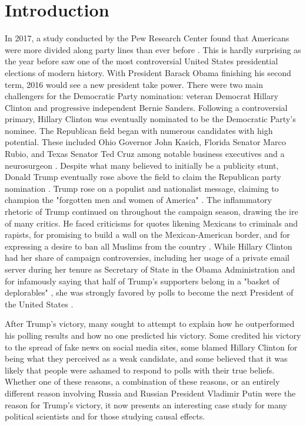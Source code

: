 \documentclass[11pt, conference,compsoc]{IEEEtran}
\begin{document}
\section{Introduction}
In 2017, a study conducted by the Pew Research Center found that Americans were more divided along party lines than ever before \cite{pewdivided}. This is hardly surprising as the year before saw one of the most controversial United States presidential elections of modern history. With President Barack Obama finishing his second term, 2016 would see a new president take power. There were two main challengers for the Democratic Party nomination: veteran Democrat Hillary Clinton and progressive independent Bernie Sanders. Following a controversial \cite{DNCcontroversy} primary, Hillary Clinton was eventually nominated to be the Democratic Party's nominee. The Republican field began with numerous candidates with high potential. These included Ohio Governor John Kasich, Florida Senator Marco Rubio, and Texas Senator Ted Cruz among notable business executives and a neurosurgeon \cite{RNCprimary}. Despite what many believed to initially be a publicity stunt, Donald Trump eventually rose above the field to claim the Republican party nomination \cite{538}. Trump rose on a populist and nationalist message, claiming to champion the "forgotten men and women of America" \cite{forgotten}. The inflammatory rhetoric of Trump continued on throughout the campaign season, drawing the ire of many critics. He faced criticisms for quotes likening Mexicans to criminals and rapists, for promising to build a wall on the Mexican-American border, and for expressing a desire to ban all Muslims from the country \cite{controversy}. While Hillary Clinton had her share of campaign controversies, including her usage of a private email server during her tenure as Secretary of State in the Obama Administration and for infamously saying that half of Trump's supporters belong in a "basket of deplorables" \cite{deplorable}, she was strongly favored by polls to become the next President of the United States \cite{polls}.

After Trump's victory, many sought to attempt to explain how he outperformed his polling results and how no one predicted his victory. Some credited his victory to the spread of fake news on social media sites, some blamed Hillary Clinton for being what they perceived as a weak candidate, and some believed that it was likely that people were ashamed to respond to polls with their true beliefs. Whether one of these reasons, a combination of these reasons, or an entirely different reason involving Russia and Russian President Vladimir Putin \cite{Russia} were the reason for Trump's victory, it now presents an interesting case study for many political scientists and for those studying causal effects.
\end{document}
